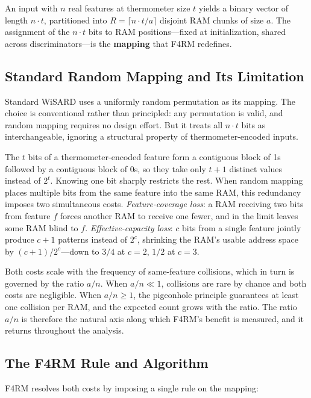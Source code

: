 \documentclass[runningheads]{llncs}
\begin{document}
An input with $n$ real features at thermometer size $t$ yields a binary vector of length $n \cdot t$, partitioned into $R = \lceil n \cdot t / a \rceil$ disjoint RAM chunks of size $a$. The assignment of the $n \cdot t$ bits to RAM positions---fixed at initialization, shared across discriminators---is the \textbf{mapping} that F4RM redefines.

\subsection{Standard Random Mapping and Its Limitation}
\label{sec:limitation}

Standard WiSARD uses a uniformly random permutation as its mapping. The choice is conventional rather than principled: any permutation is valid, and random mapping requires no design effort. But it treats all $n \cdot t$ bits as interchangeable, ignoring a structural property of thermometer-encoded inputs.

The $t$ bits of a thermometer-encoded feature form a contiguous block of 1s followed by a contiguous block of 0s, so they take only $t+1$ distinct values instead of $2^t$. Knowing one bit sharply restricts the rest. When random mapping places multiple bits from the same feature into the same RAM, this redundancy imposes two simultaneous costs. \emph{Feature-coverage loss}: a RAM receiving two bits from feature $f$ forces another RAM to receive one fewer, and in the limit leaves some RAM blind to $f$. \emph{Effective-capacity loss}: $c$ bits from a single feature jointly produce $c+1$ patterns instead of $2^c$, shrinking the RAM's usable address space by $(c+1)/2^c$---down to $3/4$ at $c=2$, $1/2$ at $c=3$.

Both costs scale with the frequency of same-feature collisions, which in turn is governed by the ratio $a/n$. When $a/n \ll 1$, collisions are rare by chance and both costs are negligible. When $a/n \geq 1$, the pigeonhole principle guarantees at least one collision per RAM, and the expected count grows with the ratio. The ratio $a/n$ is therefore the natural axis along which F4RM's benefit is measured, and it returns throughout the analysis.

\subsection{The F4RM Rule and Algorithm}
\label{sec:f4rm-rule}

F4RM resolves both costs by imposing a single rule on the mapping:
\end{document}
